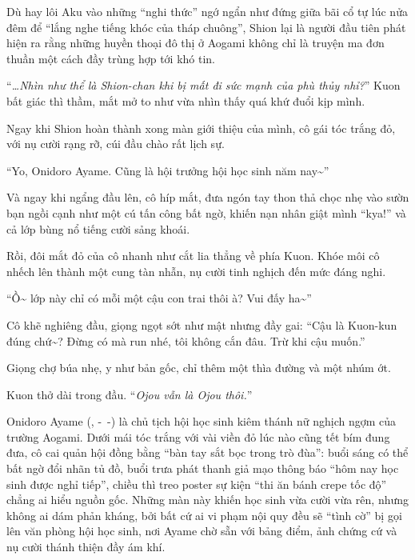 \documentclass[../main.tex]{subfiles}
\begin{document}
Dù hay lôi Aku vào những ``nghi thức'' ngớ ngẩn như đứng giữa bãi cổ tự lúc nửa đêm để ``lắng nghe tiếng khóc của tháp chuông'', Shion lại là người đầu tiên phát hiện ra rằng những huyền thoại đô thị ở Aogami không chỉ là truyện ma đơn thuần một cách đầy trùng hợp tới khó tin.

\chrint

``\textit{\dots Nhìn như thể là Shion-chan khi bị mất đi sức mạnh của phù thủy nhỉ?}'' Kuon bất giác thì thầm, mắt mở to như vừa nhìn thấy quá khứ đuổi kịp mình.

Ngay khi Shion hoàn thành xong màn giới thiệu của mình, cô gái tóc trắng đỏ, với nụ cười rạng rỡ, cúi đầu chào rất lịch sự.

``Yo, Onidoro Ayame. Cũng là hội trưởng hội học sinh năm nay\~{}''

Và ngay khi ngẩng đầu lên, cô híp mắt, đưa ngón tay thon thả chọc nhẹ vào sườn bạn ngồi cạnh như một cú tấn công bất ngờ, khiến nạn nhân giật mình ``kya!'' và cả lớp bùng nổ tiếng cười sảng khoái.

Rồi, đôi mắt đỏ của cô nhanh như cắt lia thẳng về phía Kuon. Khóe môi cô nhếch lên thành một cung tàn nhẫn, nụ cười tinh nghịch đến mức đáng nghi.

``Ồ\~{} lớp này chỉ có mỗi một cậu con trai thôi à? Vui đấy ha\~{}''

Cô khẽ nghiêng đầu, giọng ngọt sớt như mật nhưng đầy gai: ``Cậu là Kuon-kun đúng chứ\~{}? Đừng có mà run nhé, tôi không cắn đâu. Trừ khi cậu muốn.''

Giọng chợ búa nhẹ, y như bản gốc, chỉ thêm một thìa đường và một nhúm ớt.

Kuon thở dài trong đầu. ``\textit{Ojou vẫn là Ojou thôi.}''

\chrint

Onidoro Ayame (, -\ -) là chủ tịch hội học sinh kiêm thánh nữ nghịch ngợm của trường Aogami. Dưới mái tóc trắng với vài viền đỏ lúc nào cũng tết bím đung đưa, cô cai quản hội đồng bằng ``bàn tay sắt bọc trong trò đùa'': buổi sáng có thể bất ngờ đổi nhãn tủ đồ, buổi trưa phát thanh giả mạo thông báo ``hôm nay học sinh được nghỉ tiếp'', chiều thì treo poster sự kiện ``thi ăn bánh crepe tốc độ'' chẳng ai hiểu nguồn gốc. Những màn này khiến học sinh vừa cười vừa rên, nhưng không ai dám phản kháng, bởi bất cứ ai vi phạm nội quy đều sẽ ``tình cờ'' bị gọi lên văn phòng hội học sinh, nơi Ayame chờ sẵn với bảng điểm, ảnh chứng cứ và nụ cười thánh thiện đầy ám khí.
\end{document}
